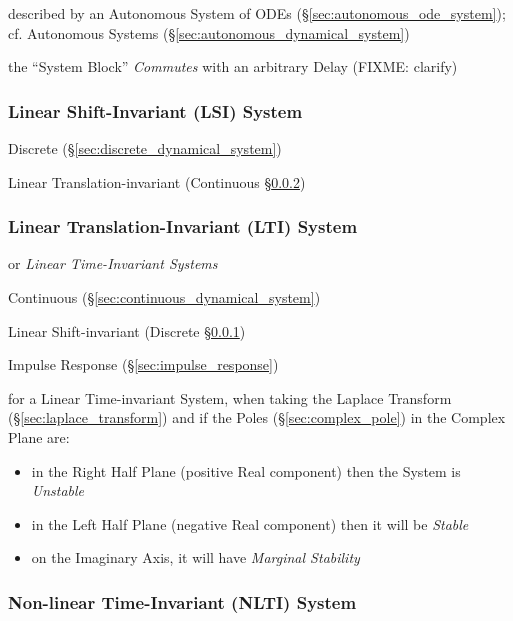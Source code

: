 described by an Autonomous System of ODEs (\S\ref{sec:autonomous_ode_system});
cf. Autonomous Systems (\S\ref{sec:autonomous_dynamical_system})

the ``System Block'' \emph{Commutes} with an arbitrary Delay (FIXME: clarify)



\subsubsection{Linear Shift-Invariant (LSI) System}\label{sec:lsi_system}

Discrete (\S\ref{sec:discrete_dynamical_system})

\fist Linear Translation-invariant (Continuous \S\ref{sec:lti_system})



\subsubsection{Linear Translation-Invariant (LTI) System}
\label{sec:lti_system}

or \emph{Linear Time-Invariant Systems}

Continuous (\S\ref{sec:continuous_dynamical_system})

\fist Linear Shift-invariant (Discrete \S\ref{sec:lsi_system})

Impulse Response (\S\ref{sec:impulse_response})

for a Linear Time-invariant System, when taking the Laplace Transform
(\S\ref{sec:laplace_transform}) and if the Poles (\S\ref{sec:complex_pole}) in
the Complex Plane are:
\begin{itemize}
  \item in the Right Half Plane (positive Real component) then the System is
    \emph{Unstable}
  \item in the Left Half Plane (negative Real component) then it will be
    \emph{Stable}
  \item on the Imaginary Axis, it will have \emph{Marginal Stability}
\end{itemize}



\subsubsection{Non-linear Time-Invariant (NLTI) System}\label{sec:nlti_system}



